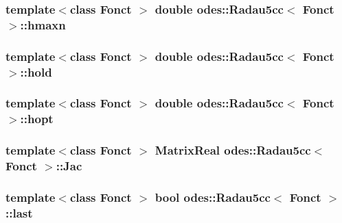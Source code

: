 \subsubsection[{hmaxn}]{\setlength{\rightskip}{0pt plus 5cm}template$<$class Fonct $>$ double {\bf odes\+::\+Radau5cc}$<$ Fonct $>$\+::hmaxn\hspace{0.3cm}{\ttfamily [private]}}\label{classodes_1_1Radau5cc_aa3b6b73884b0a085cf7f2b701940658e}
\hypertarget{classodes_1_1Radau5cc_a042b65cfeb0816edd1c2218ea9fe56c9}{}
\subsubsection[{hold}]{\setlength{\rightskip}{0pt plus 5cm}template$<$class Fonct $>$ double {\bf odes\+::\+Radau5cc}$<$ Fonct $>$\+::hold\hspace{0.3cm}{\ttfamily [private]}}\label{classodes_1_1Radau5cc_a042b65cfeb0816edd1c2218ea9fe56c9}
\hypertarget{classodes_1_1Radau5cc_a9c91cdeb773885e6b7cf3699142c80eb}{}
\subsubsection[{hopt}]{\setlength{\rightskip}{0pt plus 5cm}template$<$class Fonct $>$ double {\bf odes\+::\+Radau5cc}$<$ Fonct $>$\+::hopt\hspace{0.3cm}{\ttfamily [private]}}\label{classodes_1_1Radau5cc_a9c91cdeb773885e6b7cf3699142c80eb}
\hypertarget{classodes_1_1Radau5cc_a67b952c35d2c7ecddc9dd75cb2c3afe1}{}
\subsubsection[{Jac}]{\setlength{\rightskip}{0pt plus 5cm}template$<$class Fonct $>$ {\bf Matrix\+Real} {\bf odes\+::\+Radau5cc}$<$ Fonct $>$\+::Jac\hspace{0.3cm}{\ttfamily [private]}}\label{classodes_1_1Radau5cc_a67b952c35d2c7ecddc9dd75cb2c3afe1}
\hypertarget{classodes_1_1Radau5cc_a3eed33adfb541114d62bafd3144bf188}{}
\subsubsection[{last}]{\setlength{\rightskip}{0pt plus 5cm}template$<$class Fonct $>$ bool {\bf odes\+::\+Radau5cc}$<$ Fonct $>$\+::last\hspace{0.3cm}{\ttfamily [private]}}\label{classodes_1_1Radau5cc_a3eed33adfb541114d62bafd3144bf188}
\hypertarget{classodes_1_1Radau5cc_a8e67471bdbf858fff865561d859a066a}{}
